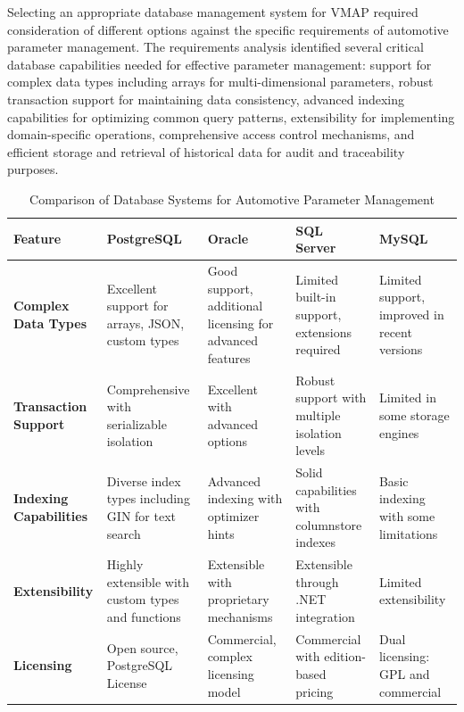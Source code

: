 Selecting an appropriate database management system for \ac{VMAP} required consideration of different options against the specific requirements of automotive parameter management. The requirements analysis identified several critical database capabilities needed for effective parameter management: support for complex data types including arrays for multi-dimensional parameters, robust transaction support for maintaining data consistency, advanced indexing capabilities for optimizing common query patterns, extensibility for implementing domain-specific operations, comprehensive access control mechanisms, and efficient storage and retrieval of historical data for audit and traceability purposes.

\begin{table}[htbp]
\centering
\caption{Comparison of Database Systems for Automotive Parameter Management}
\label{tab:database-comparison}
\begin{tabular}{|p{2.5cm}|p{2.5cm}|p{2.5cm}|p{2.5cm}|p{2.5cm}|}
\hline
\textbf{Feature} & \textbf{PostgreSQL} & \textbf{Oracle} & \textbf{SQL Server} & \textbf{MySQL} \\
\hline
\textbf{Complex Data Types} & 
Excellent support for arrays, JSON, custom types \cite{shaik2020postgresql} & 
Good support, additional licensing for advanced features \cite{agarwaloracle} & 
Limited built-in support, extensions required \cite{ward2022sql} & 
Limited support, improved in recent versions \cite{bramer2015web} \\
\hline
\textbf{Transaction Support} & 
Comprehensive with serializable isolation \cite{shaik2020postgresql} & 
Excellent with advanced options \cite{agarwaloracle} & 
Robust support with multiple isolation levels \cite{ward2022sql} & 
Limited in some storage engines \cite{kroghmysql} \\
\hline
\textbf{Indexing Capabilities} & 
Diverse index types including GIN for text search \cite{shaik2020postgresql} & 
Advanced indexing with optimizer hints \cite{agarwaloracle} & 
Solid capabilities with columnstore indexes \cite{ward2022sql} & 
Basic indexing with some limitations \cite{kroghmysql} \\
\hline
\textbf{Extensibility} & 
Highly extensible with custom types and functions \cite{shaik2020postgresql} & 
Extensible with proprietary mechanisms \cite{agarwaloracle} & 
Extensible through .NET integration \cite{ward2022sql} & 
Limited extensibility \cite{bramer2015web} \\
\hline
\textbf{Licensing} & 
Open source, PostgreSQL License \cite{shaik2020postgresql} & 
Commercial, complex licensing model \cite{agarwaloracle} & 
Commercial with edition-based pricing \cite{ward2022sql} & 
Dual licensing: GPL and commercial \cite{bramer2015web} \\
\hline
\end{tabular}
\end{table}

